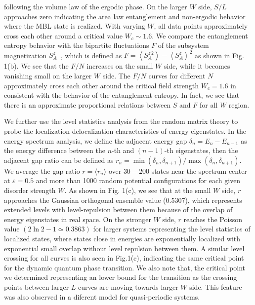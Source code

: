 \documentclass[prl,aps,epsf,showpacs,twocolumn]{revtex4}
\begin{document}
following the volume law of the ergodic phase.    On the  larger $W$ side,
$S/L$ approaches zero indicating the area law  entanglement and non-ergodic
behavior  where the MBL state is realized.  With varying $W$,  all data points
approximately cross each other around  a critical value  $W_c \sim 1.6$.  We
compare the entanglement entropy behavior with the  bipartite fluctuations $F$
of the subsystem magnetization $S^z_A$~\cite{luitz2015,song2012}, which is
defined as $F=\left\langle S^{z\,2}_A \right\rangle - \left\langle
S^z_A \right\rangle^2$
as shown  in Fig. 1(b).  We see that the $F/N$ increases on the  small  $W$
side, while it becomes vanishing small on the larger $W$ side.  The $F/N$ curves
for different $N$ approximately cross each other around the critical field
strength $W_c=1.6$ in consistent with the behavior of the entanglement entropy.
In fact, we see that there is an approximate proportional relations between $S$
and $F$  for all $W$  region. 




We further use the  level statistics analysis from the random matrix
theory\cite{atas2013,oganesyan2007} to probe the localization-delocalization
characteristics of  energy  eigenstates.
In the energy spectrum analysis\cite{luitz2015}, we define the adjacent  energy
gap $\delta_n=E_n-E_{n-1}$ as the energy difference between the $n$-th and
$(n-1)$-th eigenstates, then the adjacent gap ratio can be defined as
$r_n=\min(\delta_n, \delta_{n+1})/\max(\delta_n, \delta_{n+1})$.  We  average the
gap ratio $r=\langle r_n\rangle$  over $30-200$  states near the spectrum center at
$\varepsilon=0.5$   and more than 1000 random  potential configurations for each
given disorder  strength $W$.   As shown in Fig. 1(c),   we see that at the
small $W$ side, $r$ approaches  the Gaussian  orthogonal ensemble  value
(0.5307),  which represents extended levels with level-repulsion  between them
because of the overlap of  energy eigenstates in real space.  On the stronger
$W$ side,  $r$ reaches the Poisson value $(2\ln2-1\simeq 0.3863)$ for larger
systems representing the level statistics of   localized states, where  states
close in energies are  exponentially localized with exponential small overlap
without level repulsion between them\cite{mehta1991}.  A similar level crossing
for all curves is also seen in Fig.1(c),  indicating the same critical point for
the dynamic quantum phase transition.  We also note that,   the critical point
we determined representing an lower  bound for the transition as the crossing
points between larger $L$ curves are moving towards larger $W$ side.    This
feature was also observed in a diferent model for quasi-periodic
systems\cite{vedika2016}.
\end{document}
